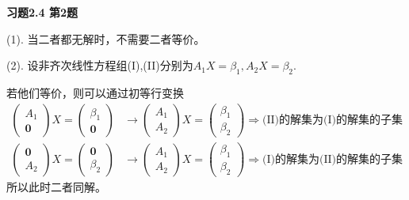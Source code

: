 \newpageorvspace

{\bf 习题2.4 第2题}

(1). 当二者都无解时，不需要二者等价。

(2). 设非齐次线性方程组(I),(II)分别为$A_1X=\beta_1, A_2X=\beta_2$.

若他们等价，则可以通过初等行变换
\begin{align*}
\begin{pmatrix} A_1 \\ \mathbf{0} \end{pmatrix} X = \begin{pmatrix} \beta_1 \\ \mathbf{0} \end{pmatrix} & \to \begin{pmatrix} A_1 \\ A_2 \end{pmatrix} X = \begin{pmatrix} \beta_1 \\ \beta_2 \end{pmatrix} \Longrightarrow \text{(II)的解集为(I)的解集的子集} \\
\begin{pmatrix} \mathbf{0} \\ A_2 \end{pmatrix} X = \begin{pmatrix} \mathbf{0} \\ \beta_2 \end{pmatrix} & \to \begin{pmatrix} A_1 \\ A_2 \end{pmatrix} X = \begin{pmatrix} \beta_1 \\ \beta_2 \end{pmatrix} \Longrightarrow \text{(I)的解集为(II)的解集的子集}
\end{align*}
所以此时二者同解。

